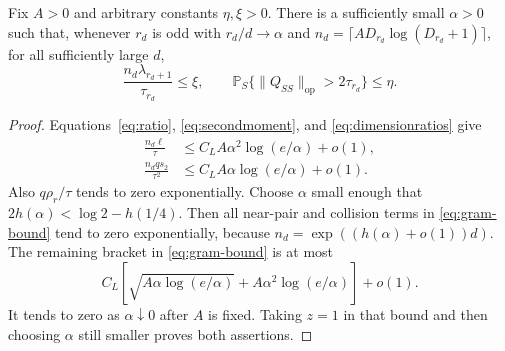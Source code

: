 \begin{corollary}
\label{cor:gram-schedule}
Fix $A>0$ and arbitrary constants $\eta,\xi>0$. There is a sufficiently
small $\alpha>0$ such that, whenever $r_d$ is odd with $r_d/d\to\alpha$
and $n_d=\lceil A D_{r_d}\log(D_{r_d}+1)\rceil$, for all sufficiently
large $d$,
\[
 \frac{n_d\lambda_{r_d+1}}{\tau_{r_d}}\le\xi,
 \qquad
 \mathbb P_S\{\|Q_{SS}\|_{\mathrm{op}}>2\tau_{r_d}\}\le\eta.
\]
\end{corollary}
\begin{proof}
Equations~\eqref{eq:ratio}, \eqref{eq:secondmoment}, and
\eqref{eq:dimensionratios} give
\begin{align*}
 \frac{n_d\ell}{\tau}
 &\le C_L A\alpha^2\log(e/\alpha)+o(1),\\
 \frac{n_dq s_2}{\tau^2}
 &\le C_L A\alpha\log(e/\alpha)+o(1).
\end{align*}
Also $q\rho_r/\tau$ tends to zero exponentially. Choose $\alpha$
small enough that $2h(\alpha)<\log2-h(1/4)$. Then all near-pair and
collision terms in \eqref{eq:gram-bound} tend to zero exponentially,
because $n_d=\exp((h(\alpha)+o(1))d)$. The remaining bracket in
\eqref{eq:gram-bound} is at most
\[
 C_L\left[\sqrt{A\alpha\log(e/\alpha)}
                 +A\alpha^2\log(e/\alpha)\right]+o(1).
\]
It tends to zero as $\alpha\downarrow0$ after $A$ is fixed. Taking
$z=1$ in that bound and then choosing $\alpha$ still smaller proves
both assertions.
\end{proof}
